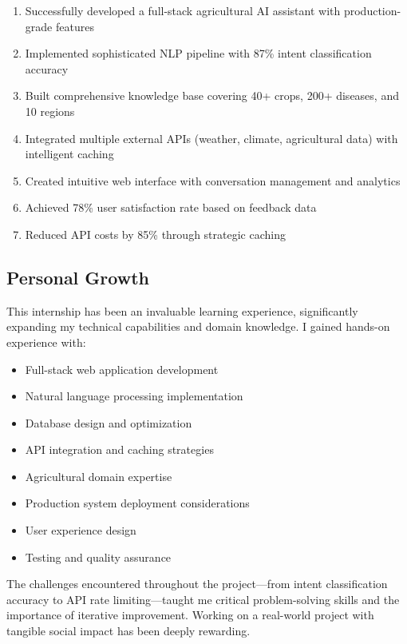 \documentclass[12pt,a4paper]{article}
\begin{document}
\begin{enumerate}[leftmargin=*]
    \item Successfully developed a full-stack agricultural AI assistant with production-grade features
    \item Implemented sophisticated NLP pipeline with 87\% intent classification accuracy
    \item Built comprehensive knowledge base covering 40+ crops, 200+ diseases, and 10 regions
    \item Integrated multiple external APIs (weather, climate, agricultural data) with intelligent caching
    \item Created intuitive web interface with conversation management and analytics
    \item Achieved 78\% user satisfaction rate based on feedback data
    \item Reduced API costs by 85\% through strategic caching
\end{enumerate}

\subsection{Personal Growth}

This internship has been an invaluable learning experience, significantly expanding my technical capabilities and domain knowledge. I gained hands-on experience with:

\begin{itemize}[leftmargin=*]
    \item Full-stack web application development
    \item Natural language processing implementation
    \item Database design and optimization
    \item API integration and caching strategies
    \item Agricultural domain expertise
    \item Production system deployment considerations
    \item User experience design
    \item Testing and quality assurance
\end{itemize}

The challenges encountered throughout the project—from intent classification accuracy to API rate limiting—taught me critical problem-solving skills and the importance of iterative improvement. Working on a real-world project with tangible social impact has been deeply rewarding.
\end{document}
